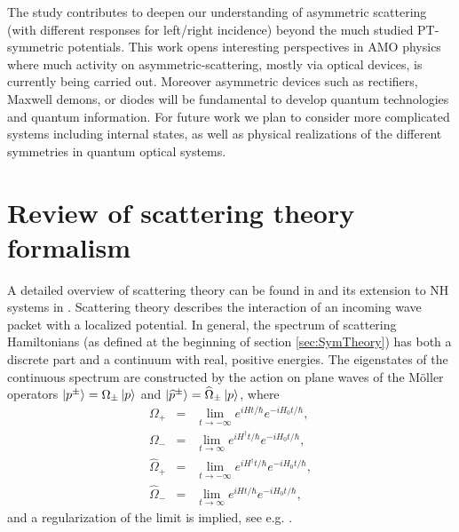 The study contributes to deepen our  understanding of asymmetric scattering  (with different responses for left/right incidence) beyond the
much studied  PT-symmetric potentials. This work opens interesting perspectives in AMO physics where much activity on asymmetric-scattering, mostly via optical devices,   is currently being carried out. Moreover asymmetric devices such as rectifiers, Maxwell demons, or diodes will be fundamental to  develop quantum technologies and quantum information. For future work we plan to consider more complicated systems including internal states, as well as physical realizations of the different symmetries in quantum optical systems.


\appendix


\section{Review of scattering theory formalism \label{sec:ScattFormalism}}
%
A detailed overview of scattering theory can be found in \cite{Taylor1972} and its extension to NH systems in \cite{Muga2004}. Scattering theory describes the interaction of an incoming wave packet with a localized potential. In general, the spectrum of scattering Hamiltonians (as defined at the beginning of section \ref{sec:SymTheory}) has both a discrete part and a continuum with real, positive energies.
The eigenstates of the continuous spectrum are constructed by the action on plane waves of the M\"oller operators
$\ket{p^\pm}=\Omega_\pm \ket{p}$ and $\ket{\widehat{p}^\pm}=\widehat{\Omega}_\pm \ket{p}$,
where
%
\begin{eqnarray}
    \Omega_+ &=& \lim_{t \to -\infty}e^{i H t / \hbar}e^{-i H_0 t/ \hbar},\nonumber\\
    \Omega_- &=& \lim_{t \to \infty}e^{i H^\dagger t/ \hbar}e^{-i H_0 t/ \hbar},\nonumber\\
    \widehat{\Omega}_+ &=& \lim_{t \to -\infty}e^{i H^\dagger t/ \hbar}e^{-i H_0 t/ \hbar},\nonumber\\
    \widehat{\Omega}_- &=& \lim_{t \to \infty}e^{i H t/ \hbar}e^{-i H_0 t/ \hbar},
\end{eqnarray}
%
and a regularization of the limit is implied, see e.g. \cite{Muga2004}.
